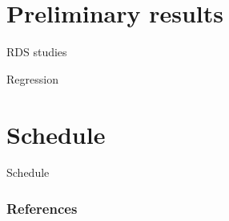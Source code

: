 \documentclass{beamer}
\begin{document}

\section{Preliminary results}


\begin{frame}{RDS studies}
  
\end{frame}

\begin{frame}{Regression}
  
\end{frame}


\section{Schedule}

\begin{frame}{Schedule}
  
\end{frame}


\begin{frame}[t, allowframebreaks]
   \frametitle{References}
   
   
 \end{frame}
\end{document}
